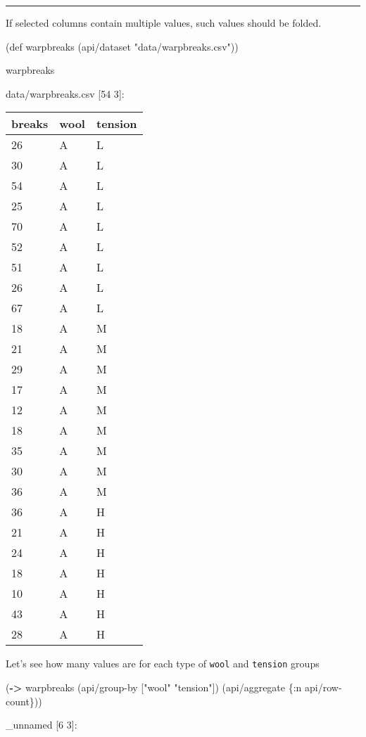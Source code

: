\documentclass[]{article}
\newenvironment{Shaded}{\begin{snugshade}}{\end{snugshade}}
\newcommand{\KeywordTok}[1]{\textcolor[rgb]{0.13,0.29,0.53}{\textbf{#1}}}
\newcommand{\StringTok}[1]{\textcolor[rgb]{0.31,0.60,0.02}{#1}}
\newcommand{\FunctionTok}[1]{\textcolor[rgb]{0.00,0.00,0.00}{#1}}
\newcommand{\BuiltInTok}[1]{#1}
\newcommand{\AttributeTok}[1]{\textcolor[rgb]{0.77,0.63,0.00}{#1}}
\newcommand{\NormalTok}[1]{#1}
\begin{document}
\begin{center}\rule{0.5\linewidth}{0.5pt}\end{center}

If selected columns contain multiple values, such values should be
folded.

\begin{Shaded}
\begin{Highlighting}[]
\NormalTok{(}\BuiltInTok{def}\FunctionTok{ warpbreaks }\NormalTok{(api/dataset }\StringTok{"data/warpbreaks.csv"}\NormalTok{))}
\end{Highlighting}
\end{Shaded}

\begin{Shaded}
\begin{Highlighting}[]
\NormalTok{warpbreaks}
\end{Highlighting}
\end{Shaded}

data/warpbreaks.csv {[}54 3{]}:

\begin{longtable}[]{@{}lll@{}}
\toprule
breaks & wool & tension\tabularnewline
\midrule
\endhead
26 & A & L\tabularnewline
30 & A & L\tabularnewline
54 & A & L\tabularnewline
25 & A & L\tabularnewline
70 & A & L\tabularnewline
52 & A & L\tabularnewline
51 & A & L\tabularnewline
26 & A & L\tabularnewline
67 & A & L\tabularnewline
18 & A & M\tabularnewline
21 & A & M\tabularnewline
29 & A & M\tabularnewline
17 & A & M\tabularnewline
12 & A & M\tabularnewline
18 & A & M\tabularnewline
35 & A & M\tabularnewline
30 & A & M\tabularnewline
36 & A & M\tabularnewline
36 & A & H\tabularnewline
21 & A & H\tabularnewline
24 & A & H\tabularnewline
18 & A & H\tabularnewline
10 & A & H\tabularnewline
43 & A & H\tabularnewline
28 & A & H\tabularnewline
\bottomrule
\end{longtable}

Let's see how many values are for each type of \texttt{wool} and
\texttt{tension} groups

\begin{Shaded}
\begin{Highlighting}[]
\NormalTok{(}\KeywordTok{->}\NormalTok{ warpbreaks}
\NormalTok{    (api/group-by [}\StringTok{"wool"} \StringTok{"tension"}\NormalTok{])}
\NormalTok{    (api/aggregate \{}\AttributeTok{:n}\NormalTok{ api/row-count\}))}
\end{Highlighting}
\end{Shaded}

\_unnamed {[}6 3{]}:
\end{document}
